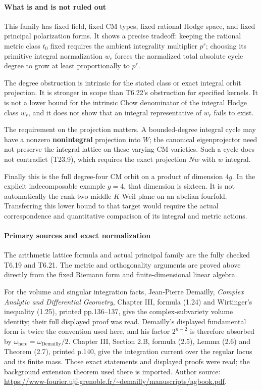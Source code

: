 \documentclass[11pt,a4paper]{article}
\theoremstyle{definition}
\begin{document}
\paragraph{What is and is not ruled out}\label{what-is-and-is-not-ruled-out}

This family has fixed field, fixed CM types, fixed rational Hodge space, and fixed principal polarization forms. It shows a precise tradeoff: keeping the rational metric class \(t_0\) fixed requires the ambient integrality multiplier \(p^r\); choosing its primitive integral normalization \(w_r\) forces the normalized total absolute cycle degree to grow at least proportionally to \(p^r\).

The degree obstruction is intrinsic for the stated class or exact integral orbit projection. It is stronger in scope than T6.22's obstruction for specified kernels. It is not a lower bound for the intrinsic Chow denominator of the integral Hodge class \(w_r\), and it does not show that an integral representative of \(w_r\) fails to exist.

The requirement on the projection matters. A bounded-degree integral cycle may have a nonzero \textbf{nonintegral} projection into \(W\); the canonical eigenprojector need not preserve the integral lattice on these varying CM varieties. Such a cycle does not contradict (T23.9), which requires the exact projection \(Nw\) with \(w\) integral.

Finally this is the full degree-four CM orbit on a product of dimension \(4g\). In the explicit indecomposable example \(g=4\), that dimension is sixteen. It is not automatically the rank-two middle \(K\)-Weil plane on an abelian fourfold. Transferring this lower bound to that target would require the actual correspondence and quantitative comparison of its integral and metric actions.

\paragraph{Primary sources and exact normalization}\label{primary-sources-and-exact-normalization}

The arithmetic lattice formula and actual principal family are the fully checked T6.19 and T6.21. The metric and orthogonality arguments are proved above directly from the fixed Riemann form and finite-dimensional linear algebra.

For the volume and singular integration facts, Jean-Pierre Demailly, \emph{Complex Analytic and Differential Geometry}, Chapter III, formula (1.24) and Wirtinger's inequality (1.25), printed pp.136--137, give the complex-subvariety volume identity; their full displayed proof was read. Demailly's displayed fundamental form is twice the convention used here, and his factor \(2^{n-2}\) is therefore absorbed by \(\omega_{\mathrm{here}}=\omega_{\mathrm{Demailly}}/2\). Chapter III, Section 2.B, formula (2.5), Lemma (2.6) and Theorem (2.7), printed p.140, give the integration current over the regular locus and its finite mass. Those exact statements and displayed proofs were read; the background extension theorem used there is imported. Author source: \url{https://www-fourier.ujf-grenoble.fr/~demailly/manuscripts/agbook.pdf}.
\end{document}
